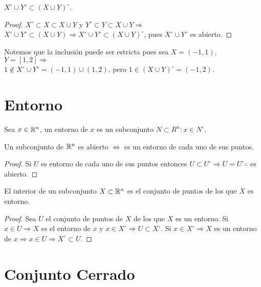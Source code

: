 \begin{prop}
  $X^{\circ} \cup Y^{\circ} \subset (X \cup Y)^{\circ}$.
  \begin{proof}
    $X^{\circ} \subset X \subset X \cup Y$ y $Y^{\circ} \subset Y \subset X \cup Y \Rightarrow$ \\
    $X^{\circ} \cup Y^{\circ} \subset (X \cup Y) \Rightarrow X^{\circ} \cup Y^{\circ} \subset (X \cup Y)^{\circ}$, pues $X^{\circ} \cup Y^{\circ}$ es abierto.
  \end{proof}
\end{prop}

Notemos que la inclusión puede ser estricta pues sea $X = (-1, 1)$, $Y = [1, 2] \Rightarrow$ \\
$1 \notin X^{\circ} \cup Y^{\circ} = (-1, 1) \cup (1, 2)$, pero $1 \in (X \cup Y)^{\circ} = (-1, 2)$.

\section{Entorno}

\begin{definition}[Entorno]
  Sea $x \in \mathbb{R}^n$, un entorno de $x$ es un subconjunto $N \subset R^n : x \in N^{\circ}$.
\end{definition}

\begin{prop}
  Un subconjunto de $\mathbb{R}^n$ es abierto $\iff$ es un entorno de cada uno de sus puntos.
  \begin{proof}
    Si $U$ es entorno de cada uno de sus puntos entonces $U \subset U^{\circ} \Rightarrow U = U^{\circ} \therefore$ es abierto.
  \end{proof}
\end{prop}

\begin{prop}
  El interior de un subconjunto $X \subset \mathbb{R}^n$ es el conjunto de puntos de los que $X$ es entorno.
  \begin{proof}
    Sea $U$ el conjunto de puntos de $X$ de los que $X$ es un entorno. Si $x \in U \Rightarrow X$ es el entorno de $x$ y $x \in X^{\circ} \Rightarrow U \subset X^{\circ}$. Si $x \in X^{\circ} \Rightarrow X$ es un entorno de $x \Rightarrow x \in U \Rightarrow X^{\circ} \subset U$.
  \end{proof}
\end{prop}

\section{Conjunto Cerrado}

